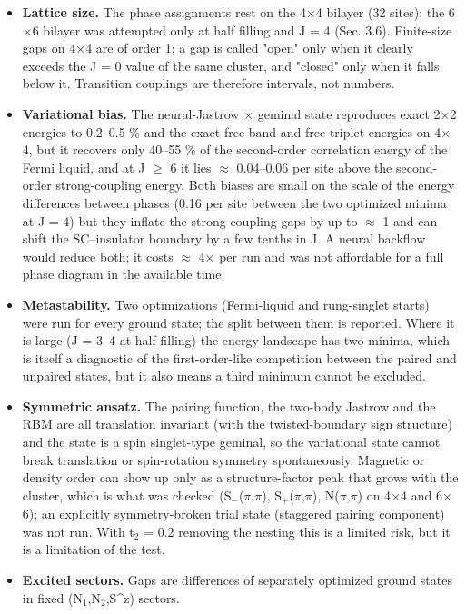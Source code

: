 \documentclass[10pt]{article}
\begin{document}
\begin{itemize}
\item \textbf{Lattice size.} The phase assignments rest on the 4$\times$4 bilayer (32 sites); the 6$\times$6 bilayer was attempted only
at half filling and J = 4 (Sec. 3.6). Finite-size gaps on 4$\times$4 are of order 1; a gap is called
"open" only when it clearly exceeds the J = 0 value of the same cluster, and "closed" only when it falls below
it. Transition couplings are therefore intervals, not numbers.
\item \textbf{Variational bias.} The neural-Jastrow $\times$ geminal state reproduces exact 2$\times$2 energies to 0.2--0.5 \% and the
exact free-band and free-triplet energies on 4$\times$4, but it recovers only 40--55 \% of the second-order correlation
energy of the Fermi liquid, and at J $\ge$ 6 it lies $\approx$ 0.04--0.06 per site above the second-order strong-coupling
energy. Both biases are small on the scale of the energy differences between phases (0.16 per site between
the two optimized minima at J = 4) but they inflate the strong-coupling gaps by up to $\approx$ 1 and can shift the
SC--insulator boundary by a few tenths in J. A neural backflow would reduce both; it costs $\approx$ 4$\times$ per run and was
not affordable for a full phase diagram in the available time.
\item \textbf{Metastability.} Two optimizations (Fermi-liquid and rung-singlet starts) were run for every ground state;
the split between them is reported. Where it is large (J = 3--4 at half filling) the energy landscape has two
minima, which is itself a diagnostic of the first-order-like competition between the paired and unpaired
states, but it also means a third minimum cannot be excluded.
\item \textbf{Symmetric ansatz.} The pairing function, the two-body Jastrow and the RBM are all translation invariant
(with the twisted-boundary sign structure) and the state is a spin singlet-type geminal, so the variational
state cannot break translation or spin-rotation symmetry spontaneously. Magnetic or density order can show
up only as a structure-factor peak that grows with the cluster, which is what was checked (S$_-$($\pi$,$\pi$),
S$_+$($\pi$,$\pi$), N($\pi$,$\pi$) on 4$\times$4 and 6$\times$6); an explicitly symmetry-broken trial state (staggered pairing component) was
not run. With t$_2$ = 0.2 removing the nesting this is a limited risk, but it is a limitation of the test.
\item \textbf{Excited sectors.} Gaps are differences of separately optimized ground states in fixed (N$_1$,N$_2$,S\^{}z) sectors.

\end{itemize}
\end{document}
